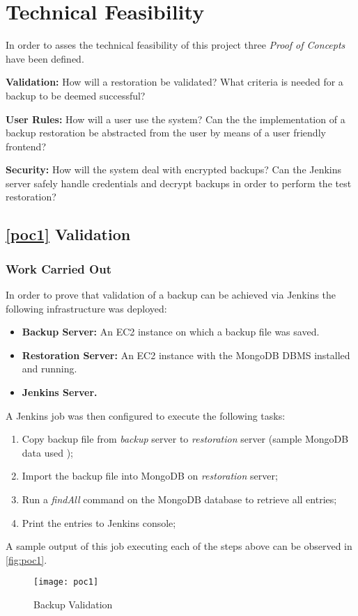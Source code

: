 
\section{Technical Feasibility}
In order to asses the technical feasibility of this project three \textit{Proof of Concepts} have been defined.

\begin{POC}
	\item \label{poc1} \textbf{Validation:} How will a restoration be validated? What criteria is needed for a backup to be deemed successful?
	\item \label{poc2} \textbf{User Rules:} How will a user use the system? Can the the implementation of a backup restoration be abstracted from the user by means of a user friendly frontend?
	\item \label{poc3} \textbf{Security:} How will the system deal with encrypted backups? Can the Jenkins server safely handle credentials and decrypt backups in order to perform the test restoration?
\end{POC}

	\subsection{\ref{poc1} Validation}
	\subsubsection{Work Carried Out}	
	In order to prove that validation of a backup can be achieved via Jenkins the following infrastructure was deployed:
	\begin{itemize}
		\item \textbf{Backup Server:} An EC2 instance on which a backup file was saved.
		\item \textbf{Restoration Server:} An EC2 instance with the MongoDB DBMS installed and running.
		\item \textbf{Jenkins Server.}
	\end{itemize}
	A Jenkins job was then configured to execute the following tasks:
	\begin{enumerate}
		\item Copy backup file from \textit{backup} server to \textit{restoration} server (sample MongoDB data used \citep{mongo});
		\item Import the backup file into MongoDB on \textit{restoration} server;
		\item Run a \textit{findAll} command on the MongoDB database to retrieve all entries;
		\item Print the entries to Jenkins console;
	\end{enumerate}
	A sample output of this job executing each of the steps above can be observed in \autoref{fig:poc1}.
	\begin{figure}[H]
		\caption{Backup Validation}
		\centering
		\texttt{[image: poc1]}
		\label{fig:poc1}
	\end{figure}
	
